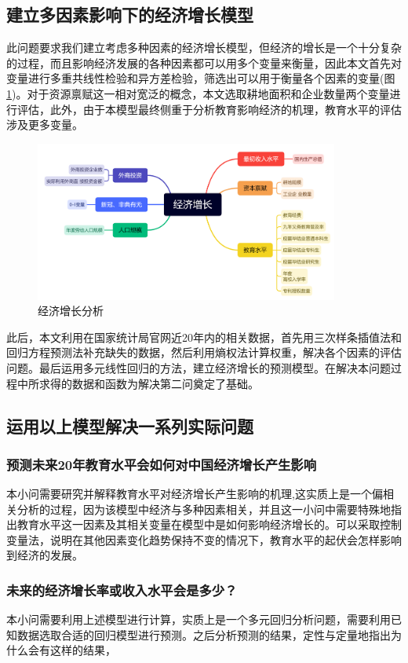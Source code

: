 \documentclass[UTF8]{article}
\begin{document}
		\subsection{建立多因素影响下的经济增长模型}
		\indent 此问题要求我们建立考虑多种因素的经济增长模型，但经济的增长是一个十分复杂的过程，而且影响经济发展的各种因素都可以用多个变量来衡量，因此本文首先对变量进行多重共线性检验和异方差检验，筛选出可以用于衡量各个因素的变量(图\ref{jjzz})。对于资源禀赋这一相对宽泛的概念，本文选取耕地面积和企业数量两个变量进行评估，此外，由于本模型最终侧重于分析教育影响经济的机理，教育水平的评估涉及更多变量。
		\newpage
		\begin{figure}[htb]
			\centering
			\includegraphics[width=10cm]{pictures/jjzz.png}
			\caption{经济增长分析}
			\label{jjzz}
		\end{figure}
		此后，本文利用在国家统计局官网近20年内的相关数据，首先用三次样条插值法和回归方程预测法补充缺失的数据，然后利用熵权法计算权重，解决各个因素的评估问题。最后运用多元线性回归的方法，建立经济增长的预测模型。在解决本问题过程中所求得的数据和函数为解决第二问奠定了基础。
		\subsection{运用以上模型解决一系列实际问题}
		\subsubsection{预测未来20年教育水平会如何对中国经济增长产生影响}
		本小问需要研究并解释教育水平对经济增长产生影响的机理,这实质上是一个偏相关分析的过程，因为该模型中经济与多种因素相关，并且这一小问中需要特殊地指出教育水平这一因素及其相关变量在模型中是如何影响经济增长的。可以采取控制变量法，说明在其他因素变化趋势保持不变的情况下，教育水平的起伏会怎样影响到经济的发展。
		\subsubsection{未来的经济增长率或收入水平会是多少？}
		本小问需要利用上述模型进行计算，实质上是一个多元回归分析问题，需要利用已知数据选取合适的回归模型进行预测。之后分析预测的结果，定性与定量地指出为什么会有这样的结果，
\end{document}

